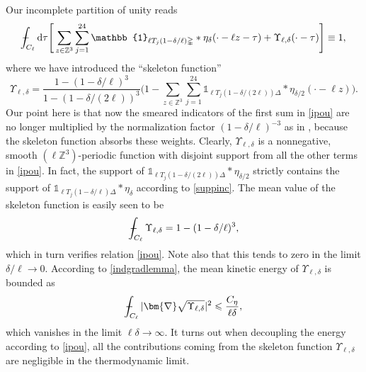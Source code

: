 \documentclass[final,onefignum,onetabnum,reqno]{amsart}
\theoremstyle{remark}
\renewcommand{\le}{\leqslant}
\newcommand{\ZZ}{\mathbb{Z}}
\newcommand{\iden}{\mathbb{1}} %
\newcommand{\grad}{\bm{\nabla}} %
\newcommand{\tetra}{\mathbb{\Delta}} %
\newcommand{\dd}{\mathrm{d}} %
\def\Xint#1{\mathchoice
{\XXint\displaystyle\textstyle{#1}}%
{\XXint\textstyle\scriptstyle{#1}}%
{\XXint\scriptstyle\scriptscriptstyle{#1}}%
{\XXint\scriptscriptstyle\scriptscriptstyle{#1}}%
\!\int}
\def\XXint#1#2#3{{\setbox0=\hbox{$#1{#2#3}{\int}$ }
\vcenter{\hbox{$#2#3$ }}\kern-.6\wd0}}
\def\dashint{\Xint-}
\begin{document}
Our incomplete partition of unity reads
\begin{equation}\label{ipou}
\dashint_{C_\ell} \dd\tau \Bigg[ \sum_{z\in\ZZ^3} \sum_{j=1}^{24} \iden_{\ell T_j(1-\delta/\ell)\tetra} * \eta_\delta(\cdot - \ell z - \tau) + \Upsilon_{\ell,\delta}(\cdot-\tau)\Bigg]\equiv 1,
\end{equation}
where we have introduced the ``skeleton function''
$$
\Upsilon_{\ell,\delta}=\frac{1-(1-\delta/\ell)^3}{1-(1-\delta/(2\ell))^3}\Bigg(1-\sum_{z\in\ZZ^3} \sum_{j=1}^{24} \iden_{\ell T_j(1-\delta/(2\ell))\tetra} * \eta_{\delta/2}(\cdot-\ell z)\Bigg).
$$
Our point here is that now the smeared indicators of the first sum in \cref{ipou} are no longer multiplied by the normalization factor $(1-\delta/\ell)^{-3}$ as in \cite{lewin2020local}, because the skeleton function absorbs these weights. 
Clearly, $\Upsilon_{\ell,\delta}$ is a nonnegative, smooth $(\ell\ZZ^3)$-periodic function with disjoint support from all the other terms in \cref{ipou}. In fact, the support of 
$\iden_{\ell T_j(1-\delta/(2\ell))\tetra} * \eta_{\delta/2}$ strictly contains the support of 
$\iden_{\ell T_j(1-\delta/\ell)\tetra} * \eta_\delta$ according to \cref{suppinc}.
The mean value of the skeleton function is easily seen to be
$$
\dashint_{C_\ell} \Upsilon_{\ell,\delta} = 1 - (1-\delta/\ell)^3,
$$
which in turn verifies relation \cref{ipou}. Note also that this tends to zero in the limit $\delta/\ell\to 0$. According to \cref{indgradlemma}, the mean kinetic energy of  $\Upsilon_{\ell,\delta}$ is bounded as
$$
\dashint_{C_\ell} |\grad\sqrt{\Upsilon_{\ell,\delta}}|^2 \le \frac{C_\eta}{\ell\delta},
$$
which vanishes in the limit $\ell\delta\to\infty$. It turns out when decoupling the energy according to \cref{ipou}, all the contributions coming from the skeleton function $\Upsilon_{\ell,\delta}$
are negligible in the thermodynamic limit.
\end{document}

